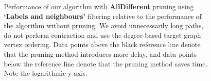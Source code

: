 \begin{figure}
\begin{subfigure} {0.5\linewidth}

\end{subfigure}

\caption{Performance of our algorithm with \textbf{AllDifferent} pruning using \textbf{`Labels and neighbours'} filtering relative to the performance of the algorithm without pruning. We avoid unnecessarily long paths, do not perform contraction and use the degree-based target graph vertex ordering. Data points above the black reference line denote that the pruning method introduces more delay, and data points below the reference line denote that the pruning method saves time. Note the logarithmic y-axis.}	
\label{fig:test}
\end{figure}


